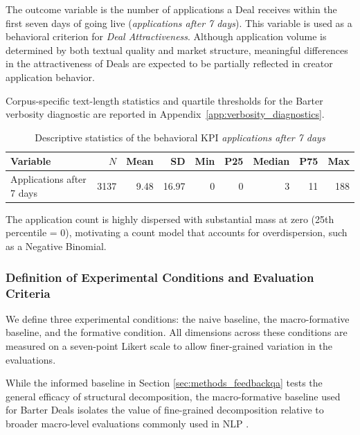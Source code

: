 The outcome variable is the number of applications a Deal receives within the first seven days of going live (\textit{applications after 7 days}). This variable is used as a behavioral criterion for \textit{Deal Attractiveness}. Although application volume is determined by both textual quality and market structure, meaningful differences in the attractiveness of Deals are expected to be partially reflected in creator application behavior.

Corpus-specific text-length statistics and quartile thresholds for the Barter verbosity diagnostic are reported in Appendix~\ref{app:verbosity_diagnostics}.


\begin{table}[h]
    \centering
    \caption{Descriptive statistics of the behavioral KPI \textit{applications after 7 days}}
    \label{tab:apps7d_stats}
    \begin{tabular}{lrrrrrrrr}
    \toprule
    Variable & $N$ & Mean & SD & Min & P25 & Median & P75 & Max \\
    \midrule
    Applications after 7 days & 3137 & 9.48 & 16.97 & 0 & 0 & 3 & 11 & 188 \\
    \bottomrule
    \end{tabular}
\end{table}

The application count is highly dispersed with substantial mass at zero (25th percentile = 0), motivating a count model that accounts for overdispersion, such as a Negative Binomial.


\subsubsection{Definition of Experimental Conditions and Evaluation Criteria}\label{sec:barter_experimentaldesign}

We define three experimental conditions: the naive baseline, the macro-formative baseline, and the formative condition. All dimensions across these conditions are measured on a seven-point Likert scale to allow finer-grained variation in the evaluations.

While the informed baseline in Section \ref{sec:methods_feedbackqa} tests the general efficacy of structural decomposition, the macro-formative baseline used for Barter Deals isolates the value of fine-grained decomposition relative to broader macro-level evaluations commonly used in NLP \citep{fabbri_summeval_2021, liu_g-eval_2023, zhongUnifiedMultiDimensionalEvaluator2022a}.

